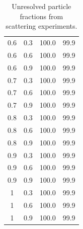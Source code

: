 \begin{table}[h]
\begin{tabular}{cccc}
0.6 & 0.3 & 100.0 & 99.9 \\
0.6 & 0.6 & 100.0 & 99.9 \\
0.6 & 0.9 & 100.0 & 99.9 \\
0.7 & 0.3 & 100.0 & 99.9 \\
0.7 & 0.6 & 100.0 & 99.9 \\
0.7 & 0.9 & 100.0 & 99.9 \\
0.8 & 0.3 & 100.0 & 99.9 \\
0.8 & 0.6 & 100.0 & 99.9 \\
0.8 & 0.9 & 100.0 & 99.9 \\
0.9 & 0.3 & 100.0 & 99.9 \\
0.9 & 0.6 & 100.0 & 99.9 \\
0.9 & 0.9 & 100.0 & 99.9 \\
1 & 0.3 & 100.0 & 99.9 \\
1 & 0.6 & 100.0 & 99.9 \\
1 & 0.9 & 100.0 & 99.9 \\
\hline
\end{tabular}
\caption{Unresolved particle fractions from scattering experiments.}
\label{tab:unresolved}
\end{table}